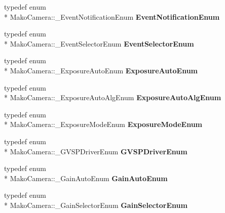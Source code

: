 \begin{DoxyCompactItemize}
\item 
\hypertarget{classMakoCamera_a59c6336e5f9a4152838abc45f81a6af4}{typedef enum \\*
Mako\-Camera\-::\-\_\-\-Event\-Notification\-Enum {\bfseries Event\-Notification\-Enum}}\label{classMakoCamera_a59c6336e5f9a4152838abc45f81a6af4}

\item 
\hypertarget{classMakoCamera_aba2c9724727845cea7ac8487b83870b9}{typedef enum \\*
Mako\-Camera\-::\-\_\-\-Event\-Selector\-Enum {\bfseries Event\-Selector\-Enum}}\label{classMakoCamera_aba2c9724727845cea7ac8487b83870b9}

\item 
\hypertarget{classMakoCamera_a448e8a933e8556339c19f88e60b6a257}{typedef enum \\*
Mako\-Camera\-::\-\_\-\-Exposure\-Auto\-Enum {\bfseries Exposure\-Auto\-Enum}}\label{classMakoCamera_a448e8a933e8556339c19f88e60b6a257}

\item 
\hypertarget{classMakoCamera_a356b97c447889f298f0a900013c4b21b}{typedef enum \\*
Mako\-Camera\-::\-\_\-\-Exposure\-Auto\-Alg\-Enum {\bfseries Exposure\-Auto\-Alg\-Enum}}\label{classMakoCamera_a356b97c447889f298f0a900013c4b21b}

\item 
\hypertarget{classMakoCamera_af09036dd83e86168861a46b4ba3a2ff8}{typedef enum \\*
Mako\-Camera\-::\-\_\-\-Exposure\-Mode\-Enum {\bfseries Exposure\-Mode\-Enum}}\label{classMakoCamera_af09036dd83e86168861a46b4ba3a2ff8}

\item 
\hypertarget{classMakoCamera_adf7e1d2f926a776fa42fbd2ea0929553}{typedef enum \\*
Mako\-Camera\-::\-\_\-\-G\-V\-S\-P\-Driver\-Enum {\bfseries G\-V\-S\-P\-Driver\-Enum}}\label{classMakoCamera_adf7e1d2f926a776fa42fbd2ea0929553}

\item 
\hypertarget{classMakoCamera_aa4c73ada2069b3e6eb3eace3d254b5a6}{typedef enum \\*
Mako\-Camera\-::\-\_\-\-Gain\-Auto\-Enum {\bfseries Gain\-Auto\-Enum}}\label{classMakoCamera_aa4c73ada2069b3e6eb3eace3d254b5a6}

\item 
\hypertarget{classMakoCamera_ad5318d7dbe3e5c1a39b27f0227219bbb}{typedef enum \\*
Mako\-Camera\-::\-\_\-\-Gain\-Selector\-Enum {\bfseries Gain\-Selector\-Enum}}\label{classMakoCamera_ad5318d7dbe3e5c1a39b27f0227219bbb}


\end{DoxyCompactItemize}
